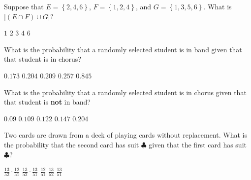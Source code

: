 \documentclass[answers,12pt]{exam}
\begin{document}
\begin{questions}
\question Suppose that $E=\left\{2,4,6\right\}$,
$F=\left\{1,2,4\right\}$, and $G=\left\{1,3,5,6\right\}$.
What is $\left|\left(E\cap F\right)\cup G\right|$?\\
\begin{oneparchoices}
\choice $1$
\choice $2$
\choice $3$
\choice $4$
\correctchoice $6$
\end{oneparchoices}


\question\label{FirstAmes} What is the probability that a randomly selected
student is in band given that that student is in chorus?\\
\begin{oneparchoices}
\correctchoice $0.173$ 
\choice $0.204$ %
\choice $0.209$ %
\choice $0.257$ %
\choice $0.845$ %
\end{oneparchoices}

\question\label{LastAmes} What is the probability that a randomly selected
student is in chorus given that that student is {\bf not} in band?\\
\begin{oneparchoices}
\choice $0.09$ %
\correctchoice $0.109$
\choice $0.122$ %
\choice $0.147$ %
\choice $0.204$ %
\end{oneparchoices}

\question Two cards are drawn from a deck of playing cards
without replacement. What is the probability that
the second card has suit $\clubsuit$ given that the
first card has suit $\clubsuit$?\\
\begin{oneparchoices}
\choice $\frac{13}{52}\cdot\frac{12}{51}$
\choice $\frac{13}{52}\cdot\frac{13}{51}$
\correctchoice $\frac{12}{51}$
\choice $\frac{13}{52}$
\choice $\frac{13}{51}$
\end{oneparchoices}

\end{questions}
\end{document}
